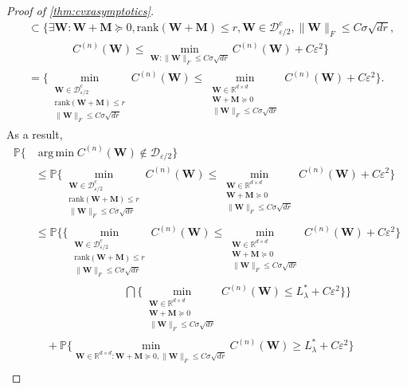\documentclass[10pt]{article}
\DeclareMathOperator*{\argmin}{arg\,min}
\newcommand{\eps}{\ensuremath{\varepsilon}}
\newcommand{\p}{\mathbb{P}}
\theoremstyle{definition}
\begin{document}
\begin{proof}[Proof of \cref{thm:cvxasymptotics}]
\begin{align}
    &\subset \bigg\{ \exists \bm{W} : \bm{W} + \bm{M} \succcurlyeq 0, \mathrm{rank}(\bm{W} + \bm{M}) \leq r, \bm{W} \in \mathcal{D}^{c}_{\eps/2}, \|\bm{W}\|_F \leq C \sigma \sqrt{dr}, \\
    &\qquad \qquad C^{(n)}(\bm{W}) \leq \min_{\bm{W}:\|\bm{W}\|_F \leq C \sigma \sqrt{dr}} C^{(n)}(\bm{W}) + C \eps^2 \bigg\} \\
    &= \bigg\{ \min_{\substack{\bm{W} \in \mathcal{D}^c_{\eps/2}\\\mathrm{rank}(\bm{W} + \bm{M}) \leq r\\\|\bm{W}\|_F \leq C \sigma \sqrt{dr}}} C^{(n)}(\bm{W}) \leq \min_{\substack{\bm{W} \in \mathbb{R}^{d\times d}\\\bm{W} + \bm{M} \succcurlyeq 0\\\|\bm{W}\|_F \leq C \sigma \sqrt{dr}}} C^{(n)} (\bm{W}) + C \eps^2 \bigg\}.
\end{align}
As a result,
\begin{align}
    \p\bigg\{ &\argmin C^{(n)}(\bm{W}) \notin \mathcal{D}_{\eps/2} \bigg\} \\
    &\leq \p \bigg\{\min_{\substack{\bm{W} \in \mathcal{D}^c_{\eps/2}\\\mathrm{rank}(\bm{W} + \bm{M}) \leq r \\ \|\bm{W}\|_F \leq C \sigma \sqrt{dr}}} C^{(n)}(\bm{W}) \leq \min_{\substack{\bm{W} \in \mathbb{R}^{d\times d}\\ \bm{W} + \bm{M} \succcurlyeq 0\\\|\bm{W}\|_F \leq C \sigma \sqrt{dr}}} C^{(n)} (\bm{W}) + C \eps^2 \bigg\} \\
    &\leq  \p\bigg\{ \big\{ \min_{\substack{\bm{W} \in \mathcal{D}^c_{\eps/2}\\\mathrm{rank}(\bm{W} + \bm{M}) \leq r\\\|\bm{W}\|_F \leq C \sigma \sqrt{dr}}} C^{(n)}(\bm{W}) \leq \min_{\substack{\bm{W} \in \mathbb{R}^{d\times d }\\\bm{W} + \bm{M} \succcurlyeq 0\\\|\bm{W}\|_F \leq C \sigma \sqrt{dr}}} C^{(n)}(\bm{W}) + C \eps ^2 \} \\
    &\qquad\qquad \qquad\qquad\bigcap \{  \min_{\substack{\bm{W} \in \mathbb{R}^{d\times d}\\ \bm{W} + \bm{M} \succcurlyeq 0\\\|\bm{W}\|_F \leq C \sigma \sqrt{dr}}} C^{(n)}(\bm{W}) \leq L^{*}_{\lambda} + C \eps^2 \big\} \bigg\}   \\
    &\quad + \p\bigg\{   \min_{\bm{W} \in \mathbb{R}^{d\times d}: \bm{W} + \bm{M} \succcurlyeq 0,\|\bm{W}\|_F \leq C \sigma \sqrt{dr}} C^{(n)}(\bm{W}) \geq L^{*}_{\lambda} + C \eps^2 \bigg\} \\

\end{align}
\end{proof}
\end{document}
